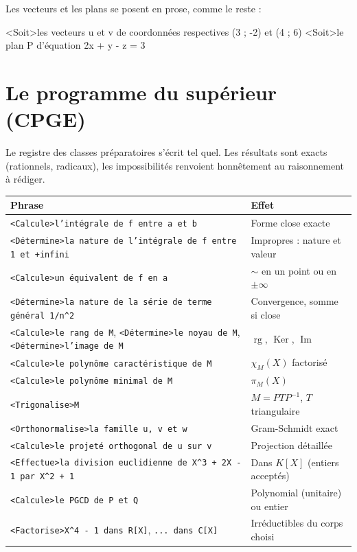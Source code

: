 \documentclass[11pt,a4paper]{article}
\newcommand{\bal}[1]{\texttt{#1}}
\begin{document}
Les vecteurs et les plans se posent en prose, comme le reste :

\begin{code}
<Soit>les vecteurs u et v de coordonnées respectives (3 ; -2) et (4 ; 6)
<Soit>le plan P d'équation 2x + y - z = 3
\end{code}

\section{Le programme du supérieur (CPGE)}

Le registre des classes préparatoires s'écrit tel quel. Les résultats
sont exacts (rationnels, radicaux), les impossibilités renvoient
honnêtement au raisonnement à rédiger.

\begin{longtable}{@{}ll@{}}
\toprule
\textbf{Phrase} & \textbf{Effet} \\
\midrule
\bal{<Calcule>l'intégrale de f entre a et b} & Forme close exacte \\
\bal{<Détermine>la nature de l'intégrale de f entre 1 et +infini} & Impropres : nature et valeur \\
\bal{<Calcule>un équivalent de f en a} & $\sim$ en un point ou en $\pm\infty$ \\
\bal{<Détermine>la nature de la série de terme général 1/n\string^2} & Convergence, somme si close \\
\bal{<Calcule>le rang de M}, \bal{<Détermine>le noyau de M}, \bal{<Détermine>l'image de M} & $\operatorname{rg}$, $\operatorname{Ker}$, $\operatorname{Im}$ \\
\bal{<Calcule>le polynôme caractéristique de M} & $\chi_M(X)$ factorisé \\
\bal{<Calcule>le polynôme minimal de M} & $\pi_M(X)$ \\
\bal{<Trigonalise>M} & $M = PTP^{-1}$, $T$ triangulaire \\
\bal{<Orthonormalise>la famille u, v et w} & Gram-Schmidt exact \\
\bal{<Calcule>le projeté orthogonal de u sur v} & Projection détaillée \\
\bal{<Effectue>la division euclidienne de X\string^3 + 2X - 1 par X\string^2 + 1} & Dans $K[X]$ (entiers acceptés) \\
\bal{<Calcule>le PGCD de P et Q} & Polynomial (unitaire) ou entier \\
\bal{<Factorise>X\string^4 - 1 dans R[X]}, \bal{... dans C[X]} & Irréductibles du corps choisi \\

\end{longtable}
\end{document}
